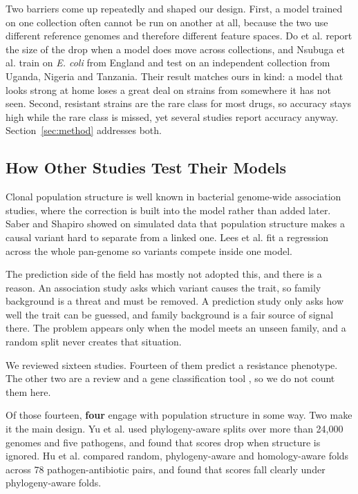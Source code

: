 \documentclass[conference]{IEEEtran}
\begin{document}
Two barriers come up repeatedly and shaped our design. First, a model trained on
one collection often cannot be run on another at all, because the two use different
reference genomes and therefore different feature spaces. Do et al. \cite{do2024}
report the size of the drop when a model does move across collections, and Nsubuga
et al. \cite{nsubuga2024} train on \textit{E. coli} from England and test on an
independent collection from Uganda, Nigeria and Tanzania. Their result matches ours
in kind: a model that looks strong at home loses a great deal on strains from
somewhere it has not seen. Second, resistant strains are the rare class for most
drugs, so accuracy stays high while the rare class is missed, yet several studies
report accuracy anyway. Section~\ref{sec:method} addresses both.

\subsection{How Other Studies Test Their Models}

Clonal population structure is well known in bacterial genome-wide association
studies, where the correction is built into the model rather than added later.
Saber and Shapiro \cite{saber2020} showed on simulated data that population
structure makes a causal variant hard to separate from a linked one. Lees et al.
\cite{lees2020} fit a regression across the whole pan-genome so variants compete
inside one model.

The prediction side of the field has mostly not adopted this, and there is a reason.
An association study asks which variant causes the trait, so family background is a
threat and must be removed. A prediction study only asks how well the trait can be
guessed, and family background is a fair source of signal there. The problem appears
only when the model meets an unseen family, and a random split never creates that
situation.

We reviewed sixteen studies. Fourteen of them predict a resistance phenotype. The
other two are a review \cite{yun2024} and a gene classification tool
\cite{arangoargoty2018}, so we do not count them here.

Of those fourteen, \textbf{four} engage with population structure in some way. Two
make it the main design. Yu et al. \cite{yu2025} used phylogeny-aware splits over
more than 24{,}000 genomes and five pathogens, and found that scores drop when
structure is ignored. Hu et al. \cite{hu2024} compared random, phylogeny-aware and
homology-aware folds across 78 pathogen-antibiotic pairs, and found that scores
fall clearly under phylogeny-aware folds.
\end{document}
